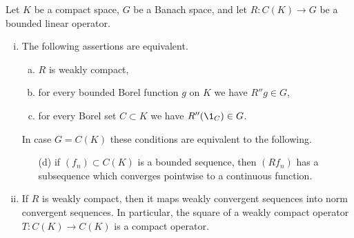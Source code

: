 \begin{proposition}\label{prop:b4-2.4}
	Let $K$ be a compact space, $G$ be a Banach space, and let $R \colon C(K) \to G$ be a bounded linear operator.
	
	\begin{enumerate}[(i)]
		\item
		The following assertions are equivalent.
		\begin{enumerate}[(a)]
		\item 
		$R$ is weakly compact,
	
		\item 
		for every bounded Borel function $g$ on $K$ we have $R''g \in G$,
	
		\item 
		for every Borel set $C \subset K$ we have $R''(\1_C) \in G$.
		\end{enumerate}
%
%
In case $G = C(K)$ these conditions are equivalent to the following.
	\begin{enumerate}
	\item[(d)] 
	if $(f_n) \subset C(K)$ is a bounded sequence, then $(Rf_n)$ has a subsequence which converges pointwise to a continuous function.
    \end{enumerate}
	
\item 
If $R$ is weakly compact, then it maps weakly convergent sequences into norm convergent sequences.
In particular, the square of a weakly
compact operator $T : C(K) \to C(K)$ is a compact operator.
\end{enumerate}
\end{proposition}

